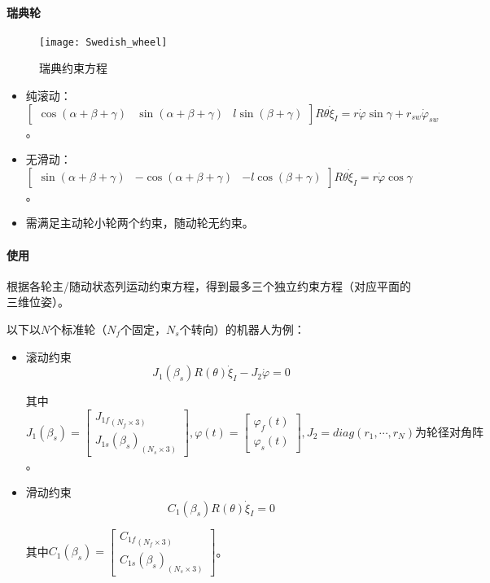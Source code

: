 \documentclass[
12pt, %
a4paper, 
oneside, %
headinclude,footinclude, %
]{scrartcl}
\begin{document}
\paragraph{瑞典轮}
\begin{figure}[H]
\centering 
\texttt{[image: Swedish\_wheel]} 
\caption[瑞典轮约束方程]{瑞典约束方程}
\end{figure}

\begin{itemize}
\item 纯滚动：$ \begin{bmatrix} \cos(\alpha + \beta + \gamma) & \sin(\alpha + \beta + \gamma) & l\sin(\beta + \gamma) \end{bmatrix} R\theta \dot{\xi}_I = r\dot{\varphi}\sin\gamma + r_{sw}\dot{\varphi}_{sw} $。
\item 无滑动：$ \begin{bmatrix} \sin(\alpha + \beta + \gamma) & -\cos(\alpha + \beta + \gamma) & -l\cos(\beta + \gamma) \end{bmatrix} R\theta \dot{\xi}_I = r\dot{\varphi}\cos\gamma $。
\item 需满足主动轮小轮两个约束，随动轮无约束。
\end{itemize}
\paragraph{使用}
根据各轮主/随动状态列运动约束方程，得到最多三个独立约束方程（对应平面的三维位姿）。

以下以$ N $个标准轮（$ N_f $个固定，$ N_s $个转向）的机器人为例：
\begin{itemize}
\item 滚动约束
$$ J_1(\beta_s) R(\theta) \dot{\xi}_I - J_2 \dot{\varphi} = 0 $$

其中
$ 
J_1(\beta_s) =  \begin{bmatrix} {J_{1f}}_{(N_f \times 3)} \\ {J_{1s}(\beta_s)}_{(N_s \times 3)} \end{bmatrix},
\varphi(t) = \begin{bmatrix} \varphi_f(t) \\ \varphi_s(t) \end{bmatrix},
J_2 = diag(r_1, \cdots, r_N)\text{为轮径对角阵}
$。
\item 滑动约束
$$ C_1(\beta_s) R(\theta) \dot{\xi}_I = 0 $$

其中$ C_1(\beta_s) = \begin{bmatrix} {C_{1f}}_{(N_f \times 3)} \\ {C_{1s}(\beta_s)}_{(N_s \times 3)} \end{bmatrix} $。
\end{itemize}
\end{document}
